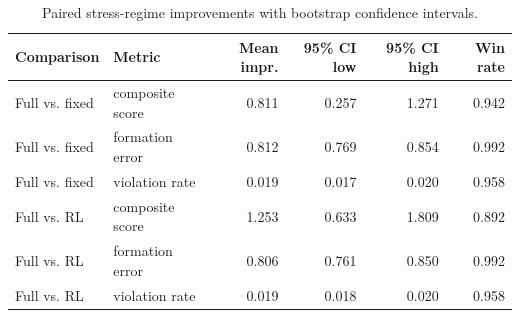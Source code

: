 \begin{table}[t]
  \centering
  \caption{Paired stress-regime improvements with bootstrap confidence intervals.}
  \label{tab:paired_statistics}
  \begin{tabular}{llrrrr}
    \toprule
    Comparison & Metric & Mean impr. & 95\% CI low & 95\% CI high & Win rate \\
    \midrule
    Full vs. fixed & composite score & 0.811 & 0.257 & 1.271 & 0.942 \\
    Full vs. fixed & formation error & 0.812 & 0.769 & 0.854 & 0.992 \\
    Full vs. fixed & violation rate & 0.019 & 0.017 & 0.020 & 0.958 \\
    Full vs. RL & composite score & 1.253 & 0.633 & 1.809 & 0.892 \\
    Full vs. RL & formation error & 0.806 & 0.761 & 0.850 & 0.992 \\
    Full vs. RL & violation rate & 0.019 & 0.018 & 0.020 & 0.958 \\
    \bottomrule
  \end{tabular}
\end{table}
